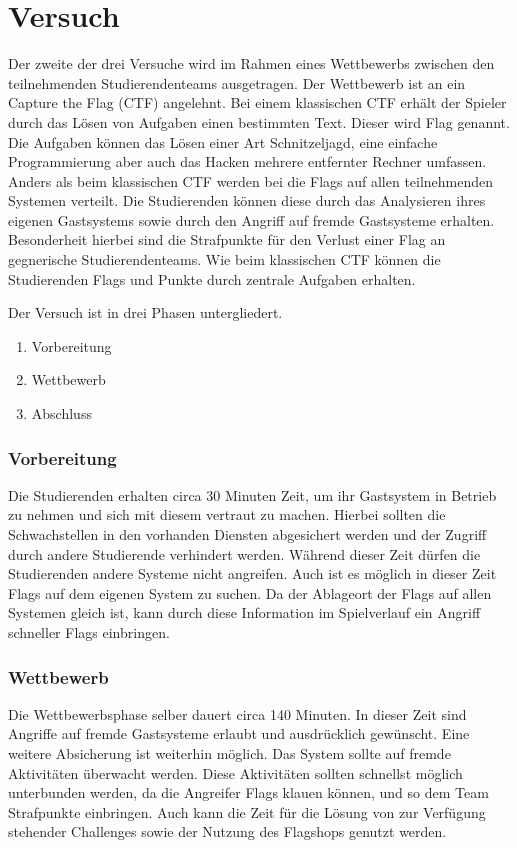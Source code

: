 \section{Versuch }
\label{sec:Versuch}

Der zweite der drei Versuche  wird im Rahmen eines Wettbewerbs zwischen den teilnehmenden Studierendenteams ausgetragen. Der Wettbewerb ist an ein Capture the Flag (CTF) angelehnt. Bei einem klassischen CTF erhält der Spieler durch das Lösen von Aufgaben einen bestimmten Text. Dieser wird Flag genannt. Die Aufgaben können das Lösen einer Art Schnitzeljagd, eine einfache Programmierung aber auch das Hacken mehrere entfernter Rechner umfassen. Anders als beim klassischen CTF werden bei  die Flags auf allen teilnehmenden Systemen verteilt. \cite{tanWhatCTFHow2020}Die Studierenden können diese durch das Analysieren ihres eigenen Gastsystems sowie durch den Angriff auf fremde Gastsysteme erhalten. Besonderheit hierbei sind die Strafpunkte für den Verlust einer Flag an gegnerische Studierendenteams. Wie beim klassischen CTF können die Studierenden Flags und Punkte durch zentrale Aufgaben erhalten.

Der Versuch ist in drei Phasen untergliedert.
\begin{enumerate}
	\item Vorbereitung
	\item Wettbewerb
	\item Abschluss
\end{enumerate}

\subsubsection{Vorbereitung}
Die Studierenden erhalten circa 30 Minuten Zeit, um ihr Gastsystem in Betrieb zu nehmen und sich mit diesem vertraut zu machen. Hierbei sollten die Schwachstellen in den vorhanden Diensten abgesichert werden und der Zugriff durch andere Studierende verhindert werden. Während dieser Zeit dürfen die Studierenden andere Systeme nicht angreifen. Auch ist es möglich in dieser Zeit Flags auf dem eigenen System zu suchen. Da der Ablageort der Flags auf allen Systemen gleich ist, kann durch diese Information im Spielverlauf ein Angriff schneller Flags einbringen.

\subsubsection{Wettbewerb}
Die Wettbewerbsphase selber dauert circa 140 Minuten. In dieser Zeit sind Angriffe auf fremde Gastsysteme erlaubt und ausdrücklich gewünscht. Eine weitere Absicherung ist weiterhin möglich. Das System sollte auf fremde Aktivitäten überwacht werden. Diese Aktivitäten sollten schnellst möglich unterbunden werden, da die Angreifer Flags klauen können, und so dem Team Strafpunkte einbringen. Auch kann die Zeit für die Lösung von zur Verfügung stehender Challenges sowie der Nutzung des Flagshops genutzt werden.

